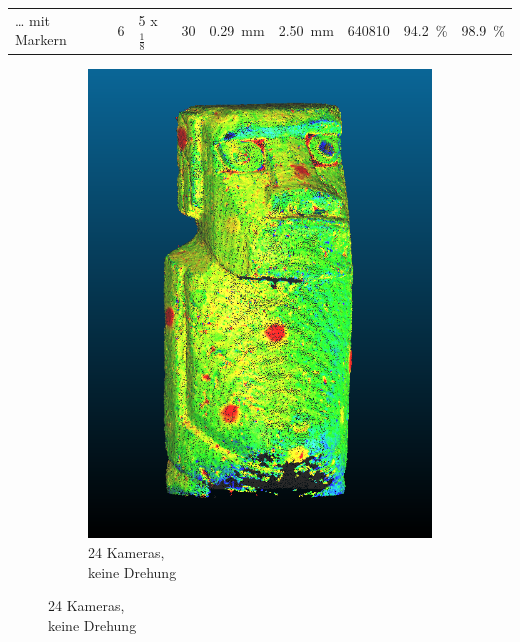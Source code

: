 \documentclass[./00PhotoBox.tex]{subfiles}
\begin{document}
\begin{table}
{\begin{tabular}{l|l|l|l|l|l|l|l|l}
            … mit Markern  & 6                                                                 & 5 x $\frac{1}{8}$        & 30                       & \SI{0,29}{\milli\metre}                                             & \SI{2,50}{\milli\metre}                                             & 640810               & \SI{94,2}{\percent}                                                          & \SI{98,9}{\percent}
        \end{tabular}
    }
\end{table}


\begin{figure}
    \centering
    \begin{subfigure}{0.30\textwidth}
        \includegraphics[width=1\linewidth]{img/7_versuche/cam_anzahl/normal.png}
        \centering
        \caption{
            24 Kameras,\\
            keine Drehung\\
}
\end{subfigure}
\end{figure}
\end{document}
